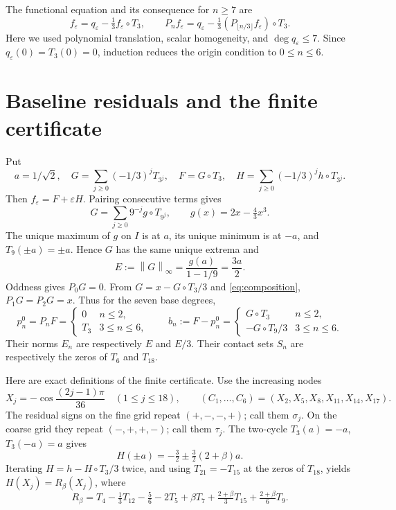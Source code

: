 \documentclass[11pt]{article}
\newcommand{\norm}[1]{\left\lVert #1\right\rVert_\infty}
\begin{document}
The functional equation and its consequence for $n\ge7$ are
\begin{equation}\label{eq:induction}
 f_\varepsilon=q_\varepsilon-\tfrac13 f_\varepsilon\circ T_3,
 \qquad
 P_n f_\varepsilon=q_\varepsilon-\tfrac13
 (P_{\lfloor n/3\rfloor}f_\varepsilon)\circ T_3.
\end{equation}
Here we used polynomial translation, scalar homogeneity, and
$\deg q_\varepsilon\le7$. Since $q_\varepsilon(0)=T_3(0)=0$, induction reduces
the origin condition to $0\le n\le6$.

\section{Baseline residuals and the finite certificate}
Put
\[
 a=1/\sqrt2,\quad
 G=\sum_{j\ge0}(-1/3)^j T_{3^j},\quad F=G\circ T_3,\quad
 H=\sum_{j\ge0}(-1/3)^j h\circ T_{3^j}.
\]
Then $f_\varepsilon=F+\varepsilon H$. Pairing consecutive terms gives
\[
 G=\sum_{j\ge0}9^{-j}g\circ T_{9^j},\qquad
 g(x)=2x-\tfrac43x^3.
\]
The unique maximum of $g$ on $I$ is at $a$, its unique minimum is at $-a$,
and $T_9(\pm a)=\pm a$. Hence $G$ has the same unique extrema and
\[
 E:=\norm G=\frac{g(a)}{1-1/9}=\frac{3a}{2}.
\]
Oddness gives $P_0G=0$. From $G=x-G\circ T_3/3$ and
\eqref{eq:composition}, $P_1G=P_2G=x$. Thus for the seven base degrees,
\begin{equation}\label{eq:baseline}
 p_n^0=P_nF=\begin{cases}0&n\le2,\\ T_3&3\le n\le6,\end{cases}
 \qquad b_n:=F-p_n^0=
 \begin{cases}G\circ T_3&n\le2,\\-G\circ T_9/3&3\le n\le6.\end{cases}
\end{equation}
Their norms $E_n$ are respectively $E$ and $E/3$. Their contact sets $S_n$
are respectively the zeros of $T_6$ and $T_{18}$.

Here are exact definitions of the finite certificate. Use the increasing nodes
\[
 X_j=-\cos\frac{(2j-1)\pi}{36}\quad(1\le j\le18),\qquad
 (C_1,\ldots,C_6)=(X_2,X_5,X_8,X_{11},X_{14},X_{17}).
\]
The residual signs on the fine grid repeat $(+,-,-,+)$; call them $\sigma_j$.
On the coarse grid they repeat $(-,+,+,-)$; call them $\tau_j$.
The two-cycle $T_3(a)=-a$, $T_3(-a)=a$ gives
\[
 H(\pm a)=-\tfrac32\pm\tfrac32(2+\beta)a.
\]
Iterating $H=h-H\circ T_3/3$ twice, and using $T_{21}=-T_{15}$ at the
zeros of $T_{18}$, yields $H(X_j)=R_\beta(X_j)$, where
\begin{equation}\label{eq:gridvalue}
 R_\beta=T_4-\tfrac13T_{12}-\tfrac56-2T_5+\beta T_7
                +\tfrac{2+\beta}{3}T_{15}+\tfrac{2+\beta}{6}T_9.
\end{equation}
\end{document}

